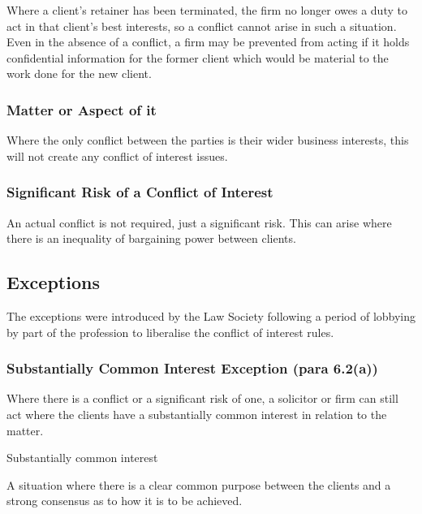 \documentclass[
]{article}
\newenvironment{env-86a00e9b-0e00-4fe8-86cd-090a54119c0f}
{
    \savenotes\tcolorbox[blanker,breakable,left=5pt,borderline west={2pt}{-4pt}{gold}]
}
{
    \endtcolorbox\spewnotes
}
\begin{document}
Where a client's retainer has been terminated, the firm no longer owes a
duty to act in that client's best interests, so a conflict cannot arise
in such a situation. Even in the absence of a conflict, a firm may be
prevented from acting if it holds confidential information for the
former client which would be material to the work done for the new
client.

\hypertarget{matter-or-aspect-of-it}{%
\subsubsection{Matter or Aspect of it}\label{matter-or-aspect-of-it}}

Where the only conflict between the parties is their wider business
interests, this will not create any conflict of interest issues.

\hypertarget{significant-risk-of-a-conflict-of-interest}{%
\subsubsection{Significant Risk of a Conflict of
Interest}\label{significant-risk-of-a-conflict-of-interest}}

An actual conflict is not required, just a significant risk. This can
arise where there is an inequality of bargaining power between clients.

\hypertarget{exceptions}{%
\subsection{Exceptions}\label{exceptions}}

The exceptions were introduced by the Law Society following a period of
lobbying by part of the profession to liberalise the conflict of
interest rules.

\hypertarget{substantially-common-interest-exception-para-6.2a}{%
\subsubsection{Substantially Common Interest Exception (para
6.2(a))}\label{substantially-common-interest-exception-para-6.2a}}

Where there is a conflict or a significant risk of one, a solicitor or
firm can still act where the clients have a substantially common
interest in relation to the matter.

\begin{env-86a00e9b-0e00-4fe8-86cd-090a54119c0f}

Substantially common interest

A situation where there is a clear common purpose between the clients
and a strong consensus as to how it is to be achieved.

\end{env-86a00e9b-0e00-4fe8-86cd-090a54119c0f}
\end{document}
